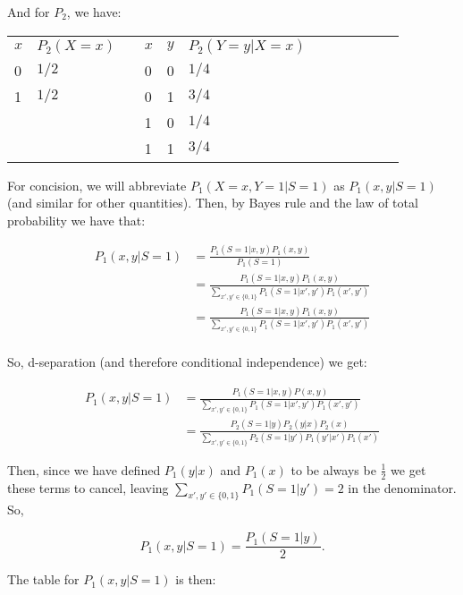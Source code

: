 \documentclass[12pt]{article}
\begin{document}
And for $P_2$, we have: \\


\begin{tabular}{llll|l|lllllll}
\multicolumn{1}{l|}{$x$} & $P_2(X = x)$ &  & $x$ & $y$ & $P_2(Y = y | X = x)$ &  &  &  &  &  &  \\ \cline{1-2} \cline{4-6}
\multicolumn{1}{l|}{0}   & $1/2$        &  & 0   & 0   & $1/4$                &  &  &  &  &  &  \\
\multicolumn{1}{l|}{1}   & $1/2$        &  & 0   & 1   & $3/4$                &  &  &  &  &  &  \\
                         &              &  & 1   & 0   & $1/4$                &  &  &  &  &  &  \\
                         &              &  & 1   & 1   & $3/4$                &  &  &  &  &  & 
\end{tabular}

For concision, we will abbreviate $P_1(X =  x, Y = 1 | S = 1)$ as $P_1(x, y | S = 1)$ (and similar for other quantities). Then, by Bayes rule and the law of total probability we have that:

\begin{align*}
P_1(x, y | S = 1) &= \frac{P_1(S = 1| x, y)P_1(x,y)}{P_1(S = 1)} \\ 
&= \frac{P_1(S = 1| x, y)P_1(x,y)}{\sum_{x', y' \in \{0, 1\}} P_1(S =1 | x', y') P_1(x', y')} \\
&= \frac{P_1(S = 1| x, y)P_1(x,y)}{\sum_{x', y' \in \{0, 1\}} P_1(S =1 | x', y') P_1(x', y')} \\
\end{align*}

So, d-separation (and therefore conditional independence) we get:

\begin{align*}
P_1(x, y | S = 1) &= \frac{P_1(S = 1| x, y)P(x,y)}{\sum_{x', y' \in \{0, 1\}} P_1(S =1 | x', y') P_1(x', y')} \\ 
&= \frac{P_2(S = 1| y)P_2(y | x)P_2(x)}{\sum_{x', y' \in \{0, 1\}} P_2(S =1 | y') P_1(y' | x') P_1(x')} 
\end{align*}

Then, since we have defined $P_1(y | x)$ and $P_1(x)$ to be always be $\frac{1}{2}$ we get these terms to cancel, leaving $\sum_{x', y' \in \{0, 1\}} P_1(S =1 | y') = 2$ in the denominator. So, 

$$P_1(x, y | S = 1) = \frac{P_1(S = 1 | y)}{2}.$$

The table for $P_1(x, y | S = 1)$ is then: \\
\end{document}
